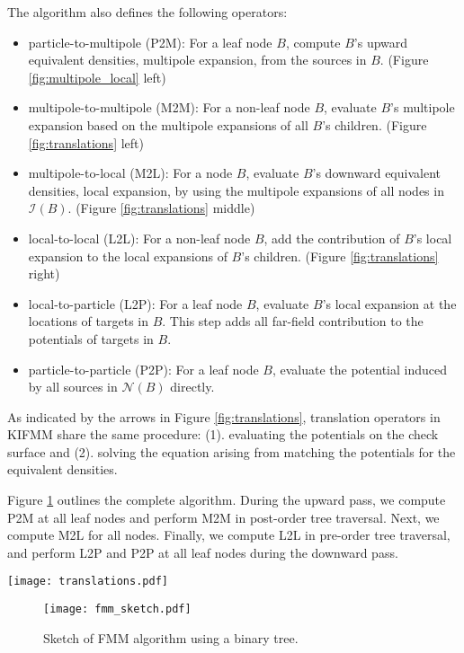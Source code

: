 The algorithm also defines the following operators:
%
\begin{itemize}
    \item particle-to-multipole (P2M): For a leaf node $B$, compute $B$'s upward equivalent densities, \ie multipole expansion, from the sources in $B$. (Figure \ref{fig:multipole_local} left)
    \item multipole-to-multipole (M2M): For a non-leaf node $B$, evaluate $B$'s multipole expansion based on the multipole expansions of all $B$'s children. (Figure \ref{fig:translations} left)
    \item multipole-to-local (M2L): For a node $B$, evaluate $B$'s downward equivalent densities, \ie local expansion, by using the multipole expansions of all nodes in $\mathcal{I}(B)$. (Figure \ref{fig:translations} middle)
    \item local-to-local (L2L): For a non-leaf node $B$, add the contribution of $B$'s local expansion to the local expansions of $B$'s children. (Figure \ref{fig:translations} right)
    \item local-to-particle (L2P): For a leaf node $B$, evaluate $B$'s local expansion at the locations of targets in $B$.
    This step adds all far-field contribution to the potentials of targets in $B$. 
    \item particle-to-particle (P2P): For a leaf node $B$, evaluate the potential induced by all sources in $\mathcal{N}(B)$ directly.
\end{itemize}
%
As indicated by the arrows in Figure \ref{fig:translations}, translation operators in KIFMM share the same procedure: (1). evaluating the potentials on the check surface and (2). solving the equation arising from matching the potentials for the equivalent densities.

Figure \ref{fig:fmm_sketch} outlines the complete \fmm algorithm.
During the upward pass, we compute P2M at all leaf nodes and perform M2M in post-order tree traversal.
Next, we compute M2L for all nodes.
Finally, we compute L2L in pre-order tree traversal, and perform L2P and P2P at all leaf nodes during the downward pass.

\begin{figure*}
    \centering
    \texttt{[image: translations.pdf]}
    \caption{M2M (left), M2L (middle) and L2L (right) operators in KIFMM. Node $C$ is the parent of $B$, and node $A$ is in the interaction list of $B$.}
    \label{fig:translations}
\end{figure*}

\begin{figure}
    \centering
    \texttt{[image: fmm\_sketch.pdf]}
    \caption{Sketch of FMM algorithm using a binary tree.}
    \label{fig:fmm_sketch}
\end{figure}